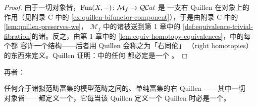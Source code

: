 \begin{proof}
由于一切\trFibrant{}对象皆\trCofibrant，$\operatorname{Fun}(X,-)\colon\mathcal{M}_{f}\to\mathcal{Q}\mathcal{C}at$ 是
一支右 Quillen \trFunctor{}在\trFibrant{}对象上的作用（见附录 C 中的%
\cref{ex:quillen-bifunctor-component}），于是由附录 C 中的\cref{lem:quillen-preserves-we}，
$\mathcal{M}_{f}$ 中的诸\trWeakEquivalence{}被送到第 1 章中的%
\cref{def:equivalence-trivial-fibration}的诸\trEquivalence。反之，由第 1 章中的%
\cref{lem:equiv-homotopy-equivalences}，\trInfinityCosmos{}中的每个\trEquivalence{}都
容许一个\trHomotopyEquivalence{}结构——后者用 Quillen 会称之为「右同伦」
（right homotopies）的东西来定义。Quillen 证明：\trModelCategory{}中的任何%
\trHomotopyEquivalence{}都必定是一个\trWeakEquivalence{} \cite[\S1.1]{bib93}。
\end{proof}

再者：

\begin{corollary}\label{cor:right-quillen-adjunction-biequivalence}
任何介于诸拟范畴富集的模型范畴之间的、单纯富集的右 Quillen \trAdjunction——其中一切%
\trFibrant{}对象皆\trCofibrant{}——都定义一个\trCosmologicalFunctor，它每当该 Quillen
\trAdjunction{}定义一个 Quillen \trEquivalence{}时必是一个\trCosmologicalBiequivalence。
\end{corollary}
